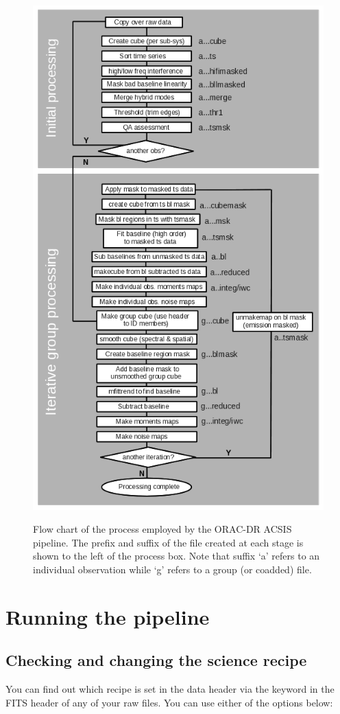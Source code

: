 \documentclass[11pt,oneside,chapters]{starlink}
\begin{document}
\begin{figure}[h!]
\begin{center}
\includegraphics[width=0.55\linewidth]{sc20_pipeline}
\label{fig:pipeline}
\caption[Flow chart of the ORAC-DR ACSIS pipeline process.]{Flow chart
of the process employed by the ORAC-DR ACSIS pipeline. The prefix and
suffix of the file created at each stage is shown to the left of the
process box. Note that suffix `a' refers to an individual observation
while `g' refers to a group (or coadded) file.}
\end{center}
\end{figure}
\setlength{\textfloatsep}{20pt plus 1.0pt minus 2.0pt}

\clearpage
\chapter{Running the pipeline}
\label{sec:runpipe}

\section{Checking and changing the science recipe}
\label{sec:changerecipe}
You can find out which recipe is set in the data header via the
 keyword in the FITS header of any of your raw files.
You can use either of the options below:
\begin{terminalv}
\end{terminalv}
\end{document}
